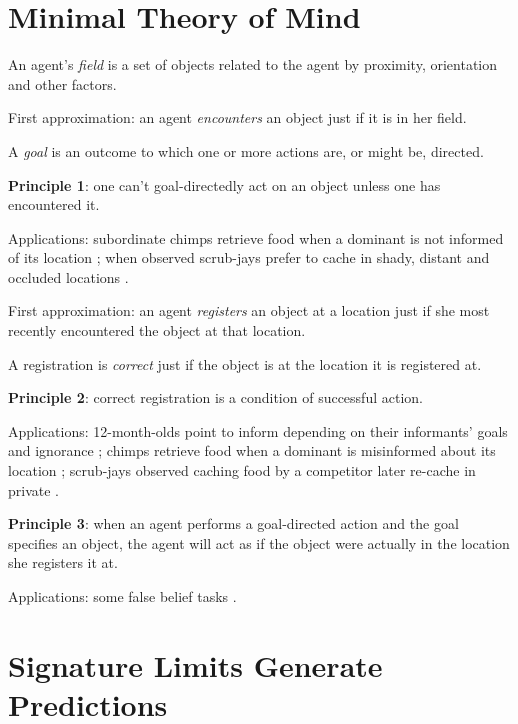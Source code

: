 \documentclass[12pt]{extarticle}
\begin{document}
\begin{multicols}{3}
 
 
\section{Minimal Theory of Mind}
 
An agent’s \emph{field} is a set of objects related to the agent by proximity, orientation and other factors.
 
First approximation: an agent \emph{encounters} an object just if it is in her field.
 
A \emph{goal} is an outcome to which one or more actions are, or might be, directed.
 
 
\textbf{Principle 1}: one can’t goal-directedly act on an object unless one has encountered it.
 
Applications: subordinate chimps retrieve food when a dominant is not informed of its location \citep{Hare:2001ph}; when observed scrub-jays prefer to cache in shady, distant and occluded locations \citep{Dally:2004xf,Clayton:2007fh}.
 
First approximation: an agent \emph{registers} an object at a location just if she most recently encountered the object at that location.
 
A registration is \emph{correct} just if the object is at the location it is registered at.
 
\textbf{Principle 2}: correct registration is a condition of successful action.
 
Applications: 12-month-olds point to inform depending on their informants’ goals and ignorance \citep{Liszkowski:2008al}; chimps retrieve food when a dominant is misinformed about its location \citep{Hare:2001ph}; scrub-jays observed caching food by a competitor later re-cache in private \citep{Clayton:2007fh,Emery:2007ze}.
 
\textbf{Principle 3}: when an agent performs a goal-directed action and the goal specifies an object, the agent will act as if the object were actually in the location she registers it at.
 
Applications: some false belief tasks \citep{Onishi:2005hm,Southgate:2007js,Buttelmann:2009gy}.
 
 
 
\section{Signature Limits Generate Predictions}
 

\end{multicols}
\end{document}
